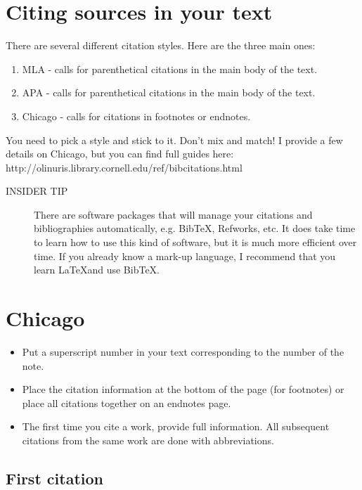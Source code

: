 \documentclass[oneside]{article}
\begin{document}
\thispagestyle{fancy}

\section{Citing sources in your text}
There are several different citation styles. Here are the three main ones: 
\begin{enumerate}
\item MLA - calls for parenthetical citations in the main body of the text.
\item APA - calls for parenthetical citations in the main body of the text. 
\item Chicago - calls for citations in footnotes or endnotes. 
\end{enumerate}
You need to pick a style and stick to it. Don't mix and match!  I provide a few details on Chicago, but you can find full guides here:\\ http://olinuris.library.cornell.edu/ref/bibcitations.html
\begin{description}
\item[INSIDER TIP] There are software packages that will manage your citations and bibliographies automatically, e.g. BibTeX, Refworks, etc. It does take time to learn how to use this kind of software, but it is much more efficient over time. If you already know a mark-up language, I recommend that you learn \LaTeX and use BibTeX. 
\end{description}

\section{Chicago}
\begin{itemize}
\item Put a superscript number in your text corresponding to the number of the note. 
\item Place the citation information at the bottom of the page (for footnotes) or place all citations together on an endnotes page.
\item The first time you cite a work, provide full information. All subsequent citations from the same work are done with abbreviations.
\end{itemize}

\subsection{First citation} 
\end{document}
